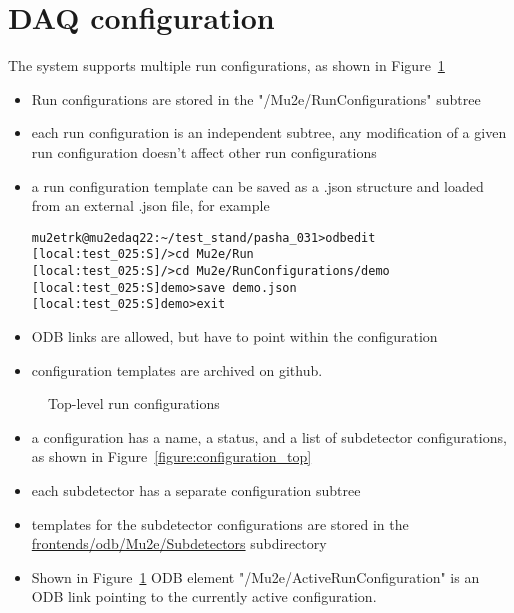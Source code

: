 \section{DAQ configuration}

The system supports multiple run configurations, as shown in Figure~\ref{figure:run_configurations}

\begin{itemize}
\item 
  Run configurations are stored in the "/Mu2e/RunConfigurations" subtree
\item
  each run configuration is an independent subtree, any modification
  of a given run configuration doesn't affect other run configurations
\item
  a run configuration template can be saved as a .json structure and loaded from
  an external .json file, for example
\begin{verbatim}
mu2etrk@mu2edaq22:~/test_stand/pasha_031>odbedit
[local:test_025:S]/>cd Mu2e/Run
[local:test_025:S]/>cd Mu2e/RunConfigurations/demo
[local:test_025:S]demo>save demo.json
[local:test_025:S]demo>exit
\end{verbatim}
\item
  ODB links are allowed, but have to point within the configuration
\item
  configuration templates are archived on github. 
\end{itemize}

\begin{figure}[H]
  \caption{
    \label{figure:run_configurations}
    Top-level run configurations
  }
\end{figure}

\begin{itemize}
\item 
  a configuration has a name, a status, and a list of subdetector configurations,
  as shown in Figure~\ref{figure:configuration_top}
\item
  each subdetector has a separate configuration subtree
\item
  templates for the subdetector configurations are stored in the 
  \href{https://github.com/pavel1murat/frontends/tree/main/odb/Mu2e/Subdetectors}
  {\blue frontends/odb/Mu2e/Subdetectors} subdirectory
\item
  Shown in  Figure~\ref{figure:run_configurations} ODB element "/Mu2e/ActiveRunConfiguration" is an ODB link
  pointing to the currently active configuration.
\end{itemize}

